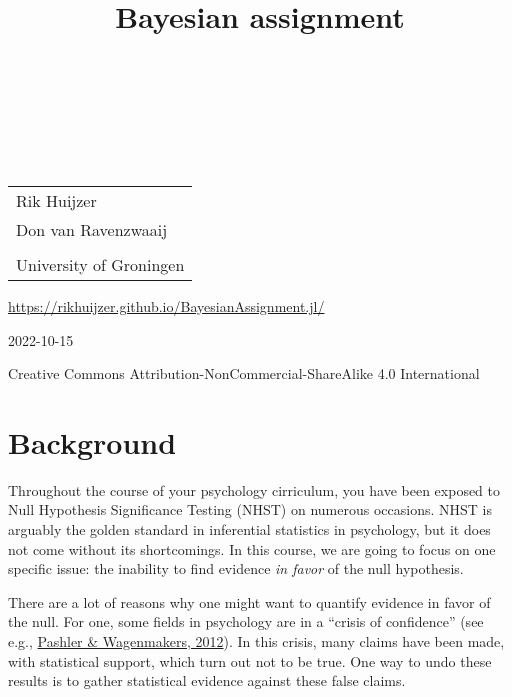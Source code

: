 \documentclass[
  notoc %
]{tufte-book}
\title{Bayesian assignment}
\author{\noindent{Rik Huijzer}\\[3mm] \noindent{Don van
Ravenzwaaij}\\[3mm] }
\date{}
\begin{document}
\makeatletter
\thispagestyle{empty}
\vfill
{\Huge\bf
\noindent
\@title
}\\[1in]
{\Large
\noindent
\@author
}
\makeatother

\makeatletter
\newpage
\thispagestyle{empty}
\vfill
{\noindent
\begin{tabular}{l}
Rik Huijzer \\
Don van Ravenzwaaij \\
\\
University of Groningen
\end{tabular}
}
\vfill
{\small
\url{https://rikhuijzer.github.io/BayesianAssignment.jl/}

2022-10-15

Creative Commons Attribution-NonCommercial-ShareAlike 4.0 International
}
\makeatother


\frontmatter
\mainmatter

\setcounter{tocdepth}{1}
\tableofcontents

\justifying

\setlength{\parindent}{0pt}

\hypertarget{sec:background}{%
\chapter{Background}\label{sec:background}}

Throughout the course of your psychology cirriculum, you have been
exposed to Null Hypothesis Significance Testing (NHST) on numerous
occasions. NHST is arguably the golden standard in inferential
statistics in psychology, but it does not come without its shortcomings.
In this course, we are going to focus on one specific issue: the
inability to find evidence \emph{in favor} of the null hypothesis.

There are a lot of reasons why one might want to quantify evidence in
favor of the null. For one, some fields in psychology are in a ``crisis
of confidence'' (see e.g.,
\protect\hyperlink{ref-pashler2012editors}{Pashler \& Wagenmakers,
2012}). In this crisis, many claims have been made, with statistical
support, which turn out not to be true. One way to undo these results is
to gather statistical evidence against these false claims.
\end{document}
